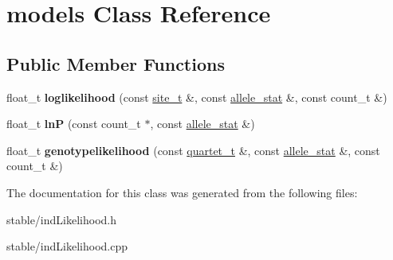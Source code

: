 \hypertarget{classmodels}{\section{models Class Reference}
\label{classmodels}
}
\subsection*{Public Member Functions}
\begin{DoxyCompactItemize}
\item 
\hypertarget{classmodels_a3239f9b2414c2fe62feaf77a696dc233}{float\-\_\-t {\bfseries loglikelihood} (const \hyperlink{classsite__t}{site\-\_\-t} \&, const \hyperlink{classallele__stat}{allele\-\_\-stat} \&, const count\-\_\-t \&)}\label{classmodels_a3239f9b2414c2fe62feaf77a696dc233}

\item 
\hypertarget{classmodels_a17c9c768804657d2491d3cf769262ca7}{float\-\_\-t {\bfseries ln\-P} (const count\-\_\-t $\ast$, const \hyperlink{classallele__stat}{allele\-\_\-stat} \&)}\label{classmodels_a17c9c768804657d2491d3cf769262ca7}

\item 
\hypertarget{classmodels_a67c5d64baed8963d4306646e5e5be38d}{float\-\_\-t {\bfseries genotypelikelihood} (const \hyperlink{structquartet}{quartet\-\_\-t} \&, const \hyperlink{classallele__stat}{allele\-\_\-stat} \&, const count\-\_\-t \&)}\label{classmodels_a67c5d64baed8963d4306646e5e5be38d}

\end{DoxyCompactItemize}


The documentation for this class was generated from the following files\-:\begin{DoxyCompactItemize}
\item 
stable/ind\-Likelihood.\-h\item 
stable/ind\-Likelihood.\-cpp\end{DoxyCompactItemize}
